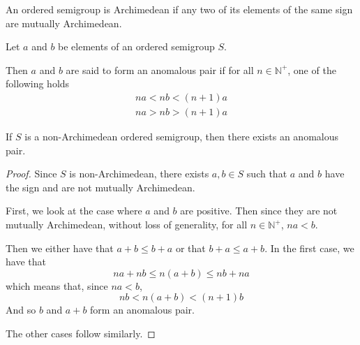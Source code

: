 \begin{definition}
An ordered semigroup is Archimedean if any two of its elements
of the same sign are mutually Archimedean.
\end{definition}

\begin{definition}
Let $a$ and $b$ be elements of an ordered semigroup $S$.

Then $a$ and $b$ are said to form an anomalous pair
if for all $n\in \mathbb{N}^+$, one of the following holds
\begin{align}
na < nb < (n+1)a \\
na > nb > (n+1)a
\end{align}
\end{definition}

\begin{theorem}
If $S$ is a non-Archimedean ordered semigroup, then there exists an anomalous pair.
\end{theorem}
\begin{proof}
Since $S$ is non-Archimedean, there exists $a,b\in S$ such that
$a$ and $b$ have the sign and are not mutually Archimedean.

First, we look at the case where $a$ and $b$ are positive.
Then since they are not mutually Archimedean, without loss of generality, for all $n\in \mathbb{N}^+$,
$na < b$.

Then we either have that $a + b \le b + a$ or that $b+a\le a + b$.
In the first case, we have that
\[
na + nb \le n(a+b) \le nb + na
\]
which means that, since $na < b$,
\[
nb < n(a+b) < (n+1)b
\]
And so $b$ and $a+b$ form an anomalous pair.

The other cases follow similarly.
\end{proof}

